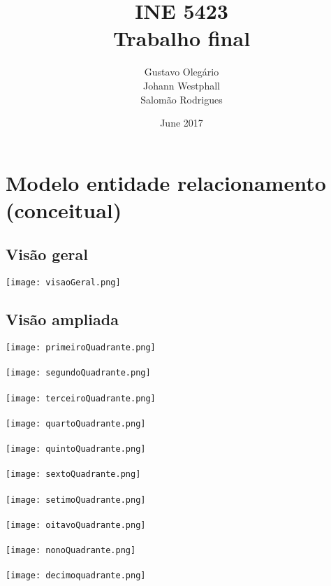 \documentclass{article}
\title{INE 5423 \\ Trabalho final}
\author{Gustavo Olegário  \\ Johann Westphall \\ Salomão Rodrigues}
\date{June 2017}
\begin{document}
    \begin{titlepage}
        \maketitle
    \end{titlepage}
    
    
    \section{Modelo entidade relacionamento (conceitual)}
        \subsection{Visão geral}
        \texttt{[image: visaoGeral.png]}
        
        \subsection{Visão ampliada}
        \texttt{[image: primeiroQuadrante.png]}
        \\
        \\
        \texttt{[image: segundoQuadrante.png]}
        \\
        \\
        \texttt{[image: terceiroQuadrante.png]}
        \\
        \\
        \texttt{[image: quartoQuadrante.png]}
        \\
        \\
        \texttt{[image: quintoQuadrante.png]}
        \\
        \\
        \texttt{[image: sextoQuadrante.png]}
        \\
        \\
        \texttt{[image: setimoQuadrante.png]}
        \\
        \\
        \texttt{[image: oitavoQuadrante.png]}
        \\
        \\
        \texttt{[image: nonoQuadrante.png]}
        \\
        \\
        \texttt{[image: decimoquadrante.png]}
        
\end{document}
